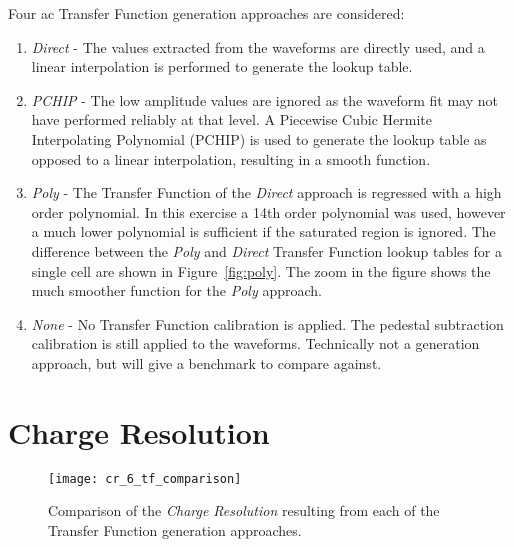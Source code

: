 Four \gls{ac} Transfer Function generation approaches are considered:
\begin{enumerate}
\item \textit{Direct} - The values extracted from the waveforms are directly used, and a linear interpolation is performed to generate the lookup table.
\item \textit{PCHIP} - The low amplitude values are ignored as the waveform fit may not have performed reliably at that level. A Piecewise Cubic Hermite Interpolating Polynomial (PCHIP) is used to generate the lookup table as opposed to a linear interpolation, resulting in a smooth function.
\item \textit{Poly} - The Transfer Function of the \textit{Direct} approach is regressed with a high order polynomial. In this exercise a 14th order polynomial was used, however a much lower polynomial is sufficient if the saturated region is ignored. The difference between the \textit{Poly} and \textit{Direct} Transfer Function lookup tables for a single cell are shown in Figure~\ref{fig:poly}. The zoom in the figure shows the much smoother function for the \textit{Poly} approach.
\item \textit{None} - No Transfer Function calibration is applied. The pedestal subtraction calibration is still applied to the waveforms. Technically not a generation approach, but will give a benchmark to compare against.
\end{enumerate}

\section{Charge Resolution}

\begin{figure}
	\centering
	\texttt{[image: cr\_6\_tf\_comparison]} 
	\caption[Comparison of the \textit{Charge Resolution} resulting from each of the Transfer Function generation approaches.]{Comparison of the \textit{Charge Resolution} resulting from each of the Transfer Function generation approaches.} 
	\label{fig:cr_6_tf_comparison}
\end{figure}

